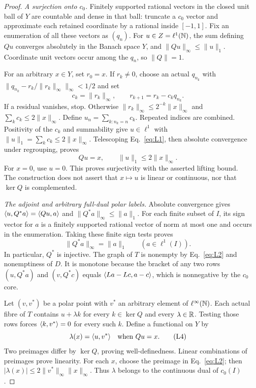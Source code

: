 \begin{proof}
\noindent\textit{A surjection onto $c_0$.}
\label{sec:L1}
Finitely supported rational vectors in the closed unit ball of $Y$ are
countable and dense in that ball: truncate a $c_0$ vector and approximate
each retained coordinate by a rational inside $[-1,1]$. Fix an enumeration
of all these vectors as $(q_n)$. For $u\in Z=\ell^1(\mathbb N)$, the sum defining
$Qu$ converges absolutely in the Banach space $Y$, and
$\|Qu\|_\infty\le\|u\|_1$. Coordinate unit vectors occur among the $q_n$,
so $\|Q\|=1$.

For an arbitrary $x\in Y$, set $r_0=x$. If $r_k\ne0$, choose an actual
$q_{n_k}$ with $\|q_{n_k}-r_k/\|r_k\|_\infty\|_\infty<1/2$ and set
\begin{equation}
c_k=\|r_k\|_\infty,\qquad r_{k+1}=r_k-c_kq_{n_k}.
\tag{L1}\label{eq:L1}
\end{equation}
If a residual vanishes, stop. Otherwise
$\|r_k\|_\infty\le2^{-k}\|x\|_\infty$ and $\sum_k c_k\le2\|x\|_\infty$.
Define $u_n=\sum_{k:n_k=n}c_k$. Repeated indices are combined.
Positivity of the $c_k$ and summability give $u\in\ell^1$ with
$\|u\|_1=\sum_k c_k\le2\|x\|_\infty$.
Telescoping Eq.~\eqref{eq:L1}, then absolute convergence under regrouping,
proves
\begin{equation}
Qu=x,\qquad \|u\|_1\le2\|x\|_\infty.
\tag{L2}\label{eq:L2}
\end{equation}
For $x=0$, use $u=0$. This proves surjectivity with the asserted lifting
bound. The construction does not assert that $x\mapsto u$ is linear or
continuous, nor that $\ker Q$ is complemented.

\noindent\textit{The adjoint and arbitrary full-dual polar labels.}
\label{sec:L2}
Absolute convergence gives $\langle u,Q^*a\rangle=\langle Qu,a\rangle$ and
$\|Q^*a\|_\infty\le\|a\|_1$. For each finite subset of $I$, its sign
vector for $a$ is a finitely supported rational vector of norm at most
one and occurs in the enumeration. Taking these finite sign tests proves
\begin{equation}
\|Q^*a\|_\infty=\|a\|_1\qquad(a\in\ell^1(I)).
\tag{L3}\label{eq:L3}
\end{equation}
In particular, $Q^*$ is injective. The graph of $T$ is nonempty by
Eq.~\eqref{eq:L2} and nonemptiness of $D$. It is monotone because the
bracket of any two rows $(u,Q^*a)$ and $(v,Q^*c)$ equals
$\langle La-Lc,a-c\rangle$, which is nonnegative by the $c_0$ core.

Let $(v,v^*)$ be a polar point with $v^*$ an arbitrary element of
$\ell^\infty(\mathbb N)$. Each actual fibre of $T$ contains $u+\lambda k$ for
every $k\in\ker Q$ and every $\lambda\in\mathbb R$. Testing those rows forces
$\langle k,v^*\rangle=0$ for every such $k$. Define a functional on $Y$ by
\begin{equation}
\lambda(x)=\langle u,v^*\rangle\quad\text{when }Qu=x.
\tag{L4}\label{eq:L4}
\end{equation}
Two preimages differ by $\ker Q$, proving well-definedness. Linear
combinations of preimages prove linearity. For each $x$, choose the
preimage in Eq.~\eqref{eq:L2}; then
$|\lambda(x)|\le2\|v^*\|_\infty\|x\|_\infty$. Thus $\lambda$ belongs to
the continuous dual of $c_0(I)$.


\end{proof}
